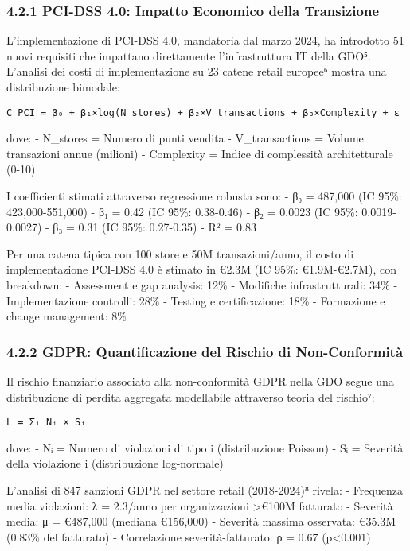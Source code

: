 \documentclass{report}
\begin{document}
\subsubsection{4.2.1 PCI-DSS 4.0: Impatto Economico della
Transizione}\label{pci-dss-4.0-impatto-economico-della-transizione}

L'implementazione di PCI-DSS 4.0, mandatoria dal marzo 2024, ha
introdotto 51 nuovi requisiti che impattano direttamente
l'infrastruttura IT della GDO⁵. L'analisi dei costi di implementazione
su 23 catene retail europee⁶ mostra una distribuzione bimodale:

\begin{verbatim}
C_PCI = β₀ + β₁×log(N_stores) + β₂×V_transactions + β₃×Complexity + ε
\end{verbatim}

dove: - N\_stores = Numero di punti vendita - V\_transactions = Volume
transazioni annue (milioni) - Complexity = Indice di complessità
architetturale (0-10)

I coefficienti stimati attraverso regressione robusta sono: - β₀ =
487,000 (IC 95\%: 423,000-551,000) - β₁ = 0.42 (IC 95\%: 0.38-0.46) - β₂
= 0.0023 (IC 95\%: 0.0019-0.0027) - β₃ = 0.31 (IC 95\%: 0.27-0.35) - R²
= 0.83

Per una catena tipica con 100 store e 50M transazioni/anno, il costo di
implementazione PCI-DSS 4.0 è stimato in €2.3M (IC 95\%: €1.9M-€2.7M),
con breakdown: - Assessment e gap analysis: 12\% - Modifiche
infrastrutturali: 34\% - Implementazione controlli: 28\% - Testing e
certificazione: 18\% - Formazione e change management: 8\%

\subsubsection{4.2.2 GDPR: Quantificazione del Rischio di
Non-Conformità}\label{gdpr-quantificazione-del-rischio-di-non-conformituxe0}

Il rischio finanziario associato alla non-conformità GDPR nella GDO
segue una distribuzione di perdita aggregata modellabile attraverso
teoria del rischio⁷:

\begin{verbatim}
L = Σᵢ Nᵢ × Sᵢ
\end{verbatim}

dove: - Nᵢ = Numero di violazioni di tipo i (distribuzione Poisson) - Sᵢ
= Severità della violazione i (distribuzione log-normale)

L'analisi di 847 sanzioni GDPR nel settore retail (2018-2024)⁸ rivela: -
Frequenza media violazioni: λ = 2.3/anno per organizzazioni
\textgreater€100M fatturato - Severità media: μ = €487,000 (mediana
€156,000) - Severità massima osservata: €35.3M (0.83\% del fatturato) -
Correlazione severità-fatturato: ρ = 0.67 (p\textless0.001)
\end{document}
